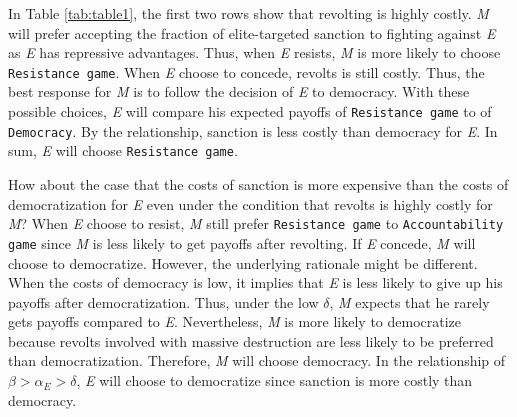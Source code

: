 \documentclass[11pt, letterpage]{article}
\begin{document}
In Table \ref{tab:table1}, the first two rows show that revolting is highly costly. \textit{M} will prefer accepting the fraction of elite-targeted sanction to fighting against \textit{E} as \textit{E} has repressive advantages. Thus, when \textit{E} resists, \textit{M} is more likely to choose \texttt{Resistance game}. When \textit{E} choose to concede, revolts is still costly. Thus, the best response for \textit{M} is to follow the decision of \textit{E} to democracy. With these possible choices, \textit{E} will compare his expected payoffs of \texttt{Resistance game} to of \texttt{Democracy}. By the relationship, sanction is less costly than democracy for \textit{E}. In sum, \textit{E} will choose \texttt{Resistance game}.

How about the case that the costs of sanction is more expensive than the costs of democratization for \textit{E} even under the condition that revolts is highly costly for \textit{M}? When \textit{E} choose to resist, \textit{M} still prefer \texttt{Resistance game} to \texttt{Accountability game} since \textit{M} is less likely to get payoffs after revolting. If \textit{E} concede, \textit{M} will choose to democratize. However, the underlying rationale might be different. When the costs of democracy is low, it implies that \textit{E} is less likely to give up his payoffs after democratization. Thus, under the low $\delta$, \textit{M} expects that he rarely gets payoffs compared to \textit{E}. Nevertheless, \textit{M} is more likely to democratize because revolts involved with massive destruction are less likely to be preferred than democratization. Therefore, \textit{M} will choose democracy. In the relationship of $\beta > \alpha_{E} > \delta$, \textit{E} will choose to democratize since sanction is more costly than democracy.
\end{document}
